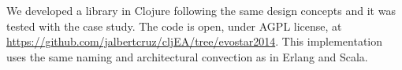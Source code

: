 
We developed a library in Clojure following the same design concepts and it was tested with the case study. The code is open, under AGPL license, at \url{https://github.com/jalbertcruz/cljEA/tree/evostar2014}. This implementation uses the same naming and architectural convection as in Erlang and Scala.